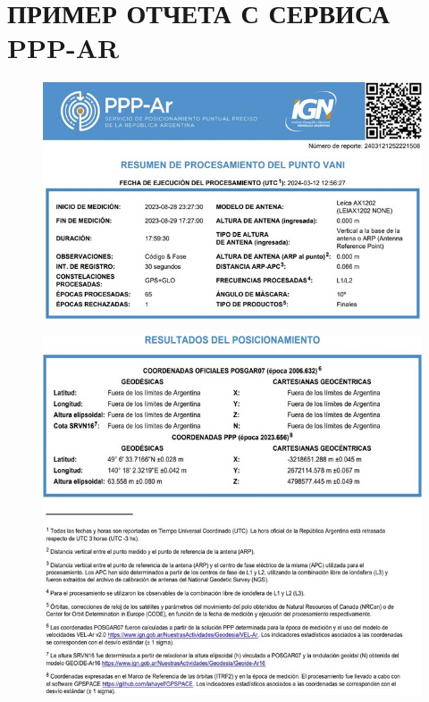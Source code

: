 \chapter{ПРИМЕР ОТЧЕТА С СЕРВИСА PPP-AR}\label{app:B}


\begin{figure}[ht]
	\centering
	\includegraphics[width=\linewidth]{images/picB01}
\end{figure}

\begin{figure}[hp]
	\centering
	\includegraphics[width=\linewidth]{images/picB02}
\end{figure}

